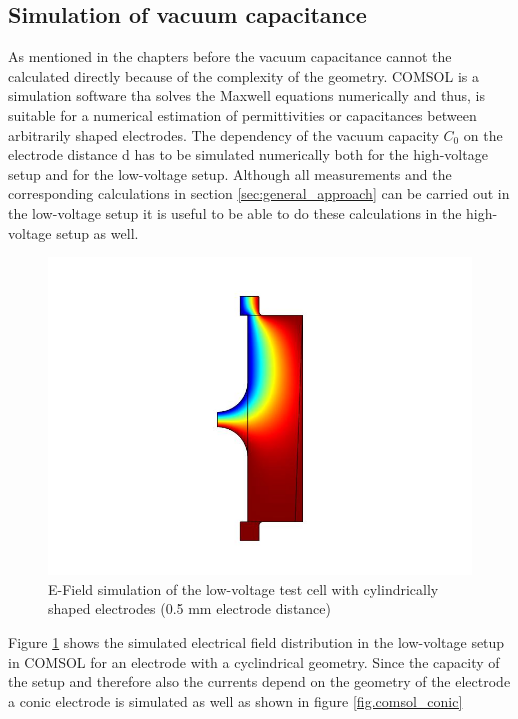 \subsection{Simulation of vacuum capacitance} 
\label{sec.sim_vac_comsol}
As mentioned in the chapters before the vacuum capacitance cannot the calculated directly because of the complexity of the geometry. COMSOL is a simulation software tha solves the Maxwell equations numerically and thus, is suitable for a numerical estimation of permittivities or capacitances between arbitrarily shaped electrodes. The dependency of the vacuum capacity $C_0$ on the electrode distance d has to be simulated numerically both for the high-voltage setup and for the low-voltage setup. Although all measurements and the corresponding calculations in section \ref{sec:general_approach} can be carried out in the low-voltage setup it is useful to be able to do these calculations in the high-voltage setup as well. 


\begin{figure}[htbp]
	\centering
	\includegraphics{figures/COMSOL_Beispielbild.jpg}		
	\caption[Kurze Abbildungsbeschreibung]{E-Field simulation of the low-voltage test cell with cylindrically shaped electrodes (0.5 mm electrode distance)} \label{fig.comsol_beispiel}

\end{figure}
 
Figure \ref{fig.comsol_beispiel} shows the simulated electrical field distribution in the low-voltage setup in COMSOL for an electrode with a cyclindrical geometry. Since the capacity of the setup and therefore also the currents depend on the geometry of the electrode a conic electrode is simulated as well as shown in figure  \ref{fig.comsol_conic}

